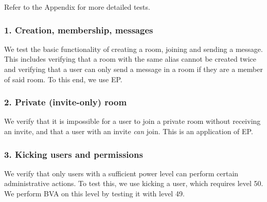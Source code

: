 \documentclass{article}
\begin{document}

Refer to the Appendix for more detailed tests.

\subsubsection*{1. Creation, membership, messages}
We test the basic functionality of creating a room, joining and sending a message. This includes verifying that a room with the same alias cannot be created twice and verifying that a user can only send a message in a room if they are a member of said room. To this end, we use EP.

\subsubsection*{2. Private (invite-only) room}
We verify that it is impossible for a user to join a private room without receiving an invite, and that a user with an invite \textit{can} join. This is an application of EP.

\subsubsection*{3. Kicking users and permissions}
We verify that only users with a sufficient power level can perform certain administrative actions. To test this, we use kicking a user, which requires level 50. We perform BVA on this level by testing it with level 49.
\end{document}

